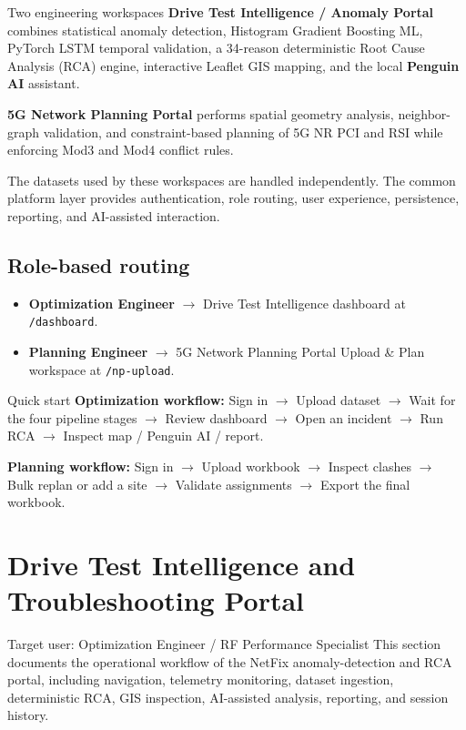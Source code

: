 \documentclass[11pt,a4paper]{article}
\begin{document}
\begin{guidebox}{Two engineering workspaces}
\textbf{Drive Test Intelligence / Anomaly Portal} combines statistical anomaly detection, Histogram Gradient Boosting ML, PyTorch LSTM temporal validation, a 34-reason deterministic Root Cause Analysis (RCA) engine, interactive Leaflet GIS mapping, and the local \textbf{Penguin AI} assistant.

\medskip
\textbf{5G Network Planning Portal} performs spatial geometry analysis, neighbor-graph validation, and constraint-based planning of 5G NR PCI and RSI while enforcing Mod3 and Mod4 conflict rules.
\end{guidebox}

The datasets used by these workspaces are handled independently. The common platform layer provides authentication, role routing, user experience, persistence, reporting, and AI-assisted interaction.

\subsection{Role-based routing}
\begin{itemize}
  \item \textbf{Optimization Engineer} $\rightarrow$ Drive Test Intelligence dashboard at \texttt{/dashboard}.
  \item \textbf{Planning Engineer} $\rightarrow$ 5G Network Planning Portal Upload \& Plan workspace at \texttt{/np-upload}.
\end{itemize}

\begin{workflowbox}{Quick start}
\textbf{Optimization workflow:} Sign in $\rightarrow$ Upload dataset $\rightarrow$ Wait for the four pipeline stages $\rightarrow$ Review dashboard $\rightarrow$ Open an incident $\rightarrow$ Run RCA $\rightarrow$ Inspect map / Penguin AI / report.

\medskip
\textbf{Planning workflow:} Sign in $\rightarrow$ Upload workbook $\rightarrow$ Inspect clashes $\rightarrow$ Bulk replan or add a site $\rightarrow$ Validate assignments $\rightarrow$ Export the final workbook.
\end{workflowbox}

\newpage

\section{Drive Test Intelligence and Troubleshooting Portal}
\begin{guidebox}{Target user: Optimization Engineer / RF Performance Specialist}
This section documents the operational workflow of the NetFix anomaly-detection and RCA portal, including navigation, telemetry monitoring, dataset ingestion, deterministic RCA, GIS inspection, AI-assisted analysis, reporting, and session history.
\end{guidebox}
\end{document}

